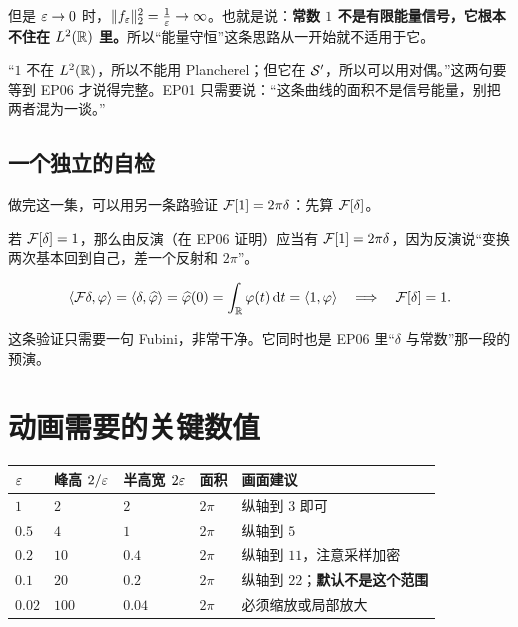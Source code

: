 但是 $\varepsilon\to0$ 时，$\|f_\varepsilon\|_2^2=\frac{1}{\varepsilon}\to\infty$。也就是说：\textbf{常数 $1$ 不是有限能量信号，它根本不住在 $L^2(\mathbb{R})$ 里。}所以“能量守恒”这条思路从一开始就不适用于它。

\begin{notebox}[要把这句话留到 EP06]
“$1$ 不在 $L^2(\mathbb{R})$，所以不能用 Plancherel；但它在 $\mathcal{S}'$，所以可以用对偶。”这两句要等到 EP06 才说得完整。EP01 只需要说：“这条曲线的面积不是信号能量，别把两者混为一谈。”
\end{notebox}

\subsection{一个独立的自检}

做完这一集，可以用另一条路验证 $\mathcal{F}[1]=2\pi\delta$：先算 $\mathcal{F}[\delta]$。

若 $\mathcal{F}[\delta]=1$，那么由反演（在 EP06 证明）应当有 $\mathcal{F}[1]=2\pi\delta$，因为反演说“变换两次基本回到自己，差一个反射和 $2\pi$”。

\begin{equation}
\langle \mathcal{F}\delta,\varphi\rangle=\langle \delta,\widehat{\varphi}\rangle=\widehat{\varphi}(0)=\int_{\mathbb{R}}\varphi(t)\mathop{}\!\mathrm{d} t=\langle 1,\varphi\rangle
\quad\Longrightarrow\quad
\mathcal{F}[\delta]=1 .
\end{equation}

这条验证只需要一句 Fubini，非常干净。它同时也是 EP06 里“$\delta$ 与常数”那一段的预演。

\section{动画需要的关键数值}

\begin{center}
\small
\renewcommand{\arraystretch}{1.35}
\begin{tabularx}{\textwidth}{@{}L{1.4cm}L{2.2cm}L{2.2cm}L{2.4cm}Y@{}}
\toprule
$\varepsilon$ & 峰高 $2/\varepsilon$ & 半高宽 $2\varepsilon$ & 面积 & 画面建议 \\
\midrule
$1$ & $2$ & $2$ & $2\pi$ & 纵轴到 $3$ 即可 \\
$0.5$ & $4$ & $1$ & $2\pi$ & 纵轴到 $5$ \\
$0.2$ & $10$ & $0.4$ & $2\pi$ & 纵轴到 $11$，注意采样加密 \\
$0.1$ & $20$ & $0.2$ & $2\pi$ & 纵轴到 $22$；\textbf{默认不是这个范围} \\
$0.02$ & $100$ & $0.04$ & $2\pi$ & 必须缩放或局部放大 \\
\bottomrule
\end{tabularx}
\end{center}

